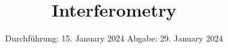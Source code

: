 

\subject{V64}
\title{Interferometry}
\date{%
  Durchführung: 15. January 2024
  \hspace{3em}
  Abgabe: 29. January 2024
}



\maketitle
\thispagestyle{empty}
\tableofcontents
\newpage






\printbibliography{}


